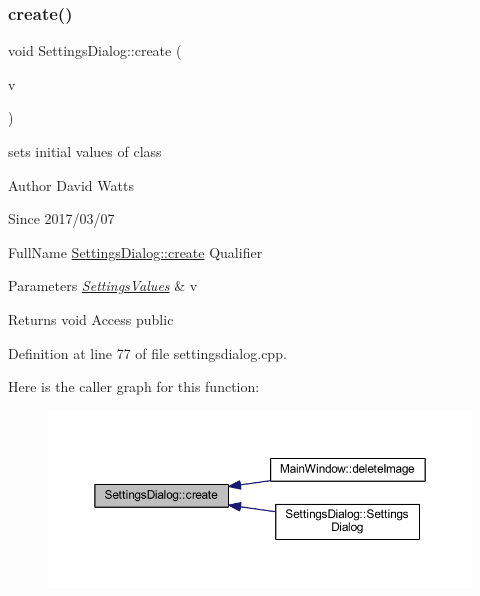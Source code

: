 \subsubsection{\texorpdfstring{create()}{create()}}
{\footnotesize\ttfamily void Settings\+Dialog\+::create (\begin{DoxyParamCaption}\item[{\hyperlink{struct_settings_values}{Settings\+Values}}]{v }\end{DoxyParamCaption})}

sets initial values of class

\begin{DoxyAuthor}{Author}
David Watts 
\end{DoxyAuthor}
\begin{DoxySince}{Since}
2017/03/07
\end{DoxySince}
Full\+Name \hyperlink{class_settings_dialog_ae84085e9bcbf5411d75f7463b874e005}{Settings\+Dialog\+::create} Qualifier 
\begin{DoxyParams}{Parameters}
{\em \hyperlink{struct_settings_values}{Settings\+Values}} & v \\
\hline
\end{DoxyParams}
\begin{DoxyReturn}{Returns}
void Access public 
\end{DoxyReturn}


Definition at line 77 of file settingsdialog.\+cpp.

Here is the caller graph for this function\+:
\nopagebreak
\begin{figure}[H]
\begin{center}
\leavevmode
\includegraphics[width=350pt]{class_settings_dialog_ae84085e9bcbf5411d75f7463b874e005_icgraph}
\end{center}
\end{figure}
\mbox{\label{class_settings_dialog_aa60a210ac0141f29ba2f0ef0ebe5f191}} 
